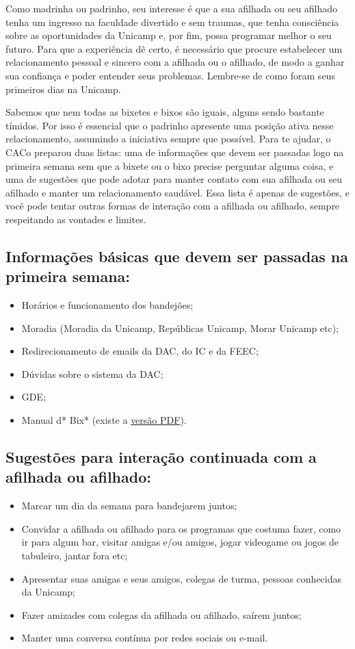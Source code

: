 \documentclass[10pt]{article}
\begin{document}
Como madrinha ou padrinho, seu interesse é que a sua afilhada ou seu afilhado
tenha um ingresso na faculdade divertido e sem traumas, que tenha consciência
sobre as oportunidades da Unicamp e, por fim, possa programar melhor o seu
futuro. Para que a experiência dê certo, é necessário que procure estabelecer
um relacionamento pessoal e sincero com a afilhada ou o afilhado, de modo a
ganhar sua confiança e poder entender seus problemas. Lembre-se de como foram
seus primeiros dias na Unicamp.

Sabemos que nem todas as bixetes e bixos são iguais, alguns sendo bastante
tímidos. Por isso é essencial que o padrinho apresente uma posição ativa nesse
relacionamento, assumindo a iniciativa sempre que possível. Para te ajudar, o
CACo preparou duas listas: uma de informações que devem ser passadas logo na
primeira semana sem que a bixete ou o bixo precise perguntar alguma coisa, e
uma de sugestões que pode adotar para manter contato com sua afilhada ou seu
afilhado e manter um relacionamento saudável. Essa lista é apenas de sugestões,
e você pode tentar outras formas de interação com a afilhada ou afilhado,
sempre respeitando as vontades e limites.

\subsection*{Informações básicas que devem ser passadas na primeira semana:}
\begin{itemize}[noitemsep] %
\item Horários e funcionamento dos bandejões;
\item Moradia (Moradia da Unicamp, Repúblicas Unicamp, Morar Unicamp etc);
\item Redirecionamento de emails da DAC, do IC e da FEEC;
\item Dúvidas sobre o sistema da DAC;
\item GDE;
\item Manual d* Bix* (existe a \href{http://www.caco.ic.unicamp.br/manual.pdf}
  {versão PDF}).
\end{itemize}

\subsection*{Sugestões para interação continuada com a afilhada ou afilhado:}
\begin{itemize}[noitemsep]
\item Marcar um dia da semana para bandejarem juntos;
\item Convidar a afilhada ou afilhado para os programas que costuma fazer,
  como ir para algum bar, visitar amigas e/ou amigos, jogar videogame ou jogos
  de tabuleiro, jantar fora etc;
\item Apresentar suas amigas e seus amigos, colegas de turma, pessoas
  conhecidas da Unicamp;
\item Fazer amizades com colegas da afilhada ou afilhado, saírem juntos;
\item Manter uma conversa contínua por redes sociais ou e-mail.
\end{itemize}
\end{document}

